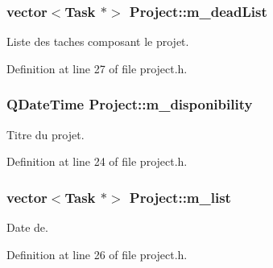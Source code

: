 \hypertarget{class_project_aa7e880f1492d4d98e4f6a12ef70cc56c}{}
\subsubsection[{m\+\_\+dead\+List}]{\setlength{\rightskip}{0pt plus 5cm}vector$<${\bf Task} $\ast$$>$ Project\+::m\+\_\+dead\+List\hspace{0.3cm}{\ttfamily [protected]}}\label{class_project_aa7e880f1492d4d98e4f6a12ef70cc56c}


Liste des taches composant le projet. 



Definition at line 27 of file project.\+h.

\hypertarget{class_project_aa1a099bc7b5d5fce04b9f5cf49c86de4}{}
\subsubsection[{m\+\_\+disponibility}]{\setlength{\rightskip}{0pt plus 5cm}Q\+Date\+Time Project\+::m\+\_\+disponibility\hspace{0.3cm}{\ttfamily [protected]}}\label{class_project_aa1a099bc7b5d5fce04b9f5cf49c86de4}


Titre du projet. 



Definition at line 24 of file project.\+h.

\hypertarget{class_project_a355bcbeebfa82539904c5febda32085c}{}
\subsubsection[{m\+\_\+list}]{\setlength{\rightskip}{0pt plus 5cm}vector$<${\bf Task} $\ast$$>$ Project\+::m\+\_\+list\hspace{0.3cm}{\ttfamily [protected]}}\label{class_project_a355bcbeebfa82539904c5febda32085c}


Date de. 



Definition at line 26 of file project.\+h.

\hypertarget{class_project_ac195bf7656682a495a15cc18355daf72}{}
